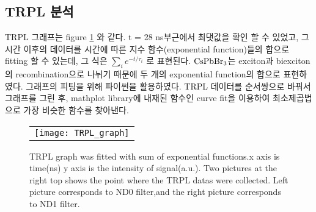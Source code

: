 \subsection{TRPL 분석}
TRPL 그래프는 figure \ref{fig:FIR105} 와 같다. t = 28 ns부근에서 최댓값을 확인 할 수 있었고, 그 시간 이후의 데이터를 시간에 따른 지수 함수(exponential function)들의 합으로 fitting 할 수 있는데, 그 식은 $\sum_{i}^{} {e}^{-t/{\tau}_{i}}$ 로 표현된다. $\rm{CsPbBr_3}$는 exciton과 biexciton의 recombination으로 나뉘기 때문에 두 개의 exponential function의 합으로 표현하였다. 그래프의 피팅을 위해 파이썬을 활용하였다. TRPL 데이터를 순서쌍으로 바꿔서 그래프를 그린 후, mathplot library에 내재된 함수인 curve fit을 이용하여 최소제곱법으로 가장 비슷한 함수를 찾아낸다.
\begin{figure}[h]
	\begin{center}
		\begin{tabular}{c}
			\texttt{[image: TRPL\_graph]}
		\end{tabular}
		\caption{TRPL graph was fitted with sum of exponential functions.x axis is time(ns) y axis is the intensity of signal(a.u.). Two pictures at the right top shows the point where the TRPL datas were collected. Left picture corresponds to ND0 filter,and the right picture corresponds to ND1 filter. }	
		\label{fig:FIR105}
	\end{center}
\end{figure}

